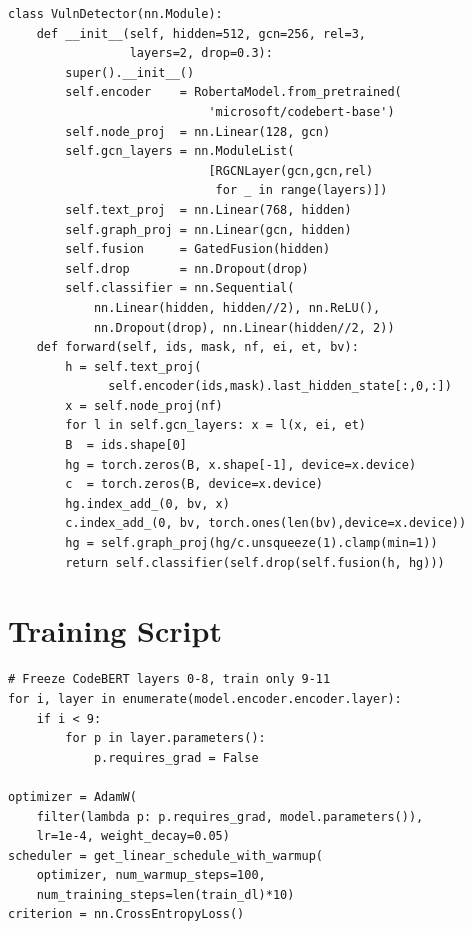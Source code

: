 \documentclass[12pt, letterpaper]{article}
\begin{document}
\begin{appendices}
\begin{lstlisting}[caption={step4\_model/full\_model.py — core architecture},
                   label={lst:model}]
class VulnDetector(nn.Module):
    def __init__(self, hidden=512, gcn=256, rel=3,
                 layers=2, drop=0.3):
        super().__init__()
        self.encoder    = RobertaModel.from_pretrained(
                            'microsoft/codebert-base')
        self.node_proj  = nn.Linear(128, gcn)
        self.gcn_layers = nn.ModuleList(
                            [RGCNLayer(gcn,gcn,rel)
                             for _ in range(layers)])
        self.text_proj  = nn.Linear(768, hidden)
        self.graph_proj = nn.Linear(gcn, hidden)
        self.fusion     = GatedFusion(hidden)
        self.drop       = nn.Dropout(drop)
        self.classifier = nn.Sequential(
            nn.Linear(hidden, hidden//2), nn.ReLU(),
            nn.Dropout(drop), nn.Linear(hidden//2, 2))
    def forward(self, ids, mask, nf, ei, et, bv):
        h = self.text_proj(
              self.encoder(ids,mask).last_hidden_state[:,0,:])
        x = self.node_proj(nf)
        for l in self.gcn_layers: x = l(x, ei, et)
        B  = ids.shape[0]
        hg = torch.zeros(B, x.shape[-1], device=x.device)
        c  = torch.zeros(B, device=x.device)
        hg.index_add_(0, bv, x)
        c.index_add_(0, bv, torch.ones(len(bv),device=x.device))
        hg = self.graph_proj(hg/c.unsqueeze(1).clamp(min=1))
        return self.classifier(self.drop(self.fusion(h, hg)))
\end{lstlisting}

\section{Training Script}
\label{app:train}

\begin{lstlisting}[caption={step5\_train/train.py — core training loop},
                   label={lst:train}]
# Freeze CodeBERT layers 0-8, train only 9-11
for i, layer in enumerate(model.encoder.encoder.layer):
    if i < 9:
        for p in layer.parameters():
            p.requires_grad = False

optimizer = AdamW(
    filter(lambda p: p.requires_grad, model.parameters()),
    lr=1e-4, weight_decay=0.05)
scheduler = get_linear_schedule_with_warmup(
    optimizer, num_warmup_steps=100,
    num_training_steps=len(train_dl)*10)
criterion = nn.CrossEntropyLoss()


\end{lstlisting}
\end{appendices}
\end{document}
